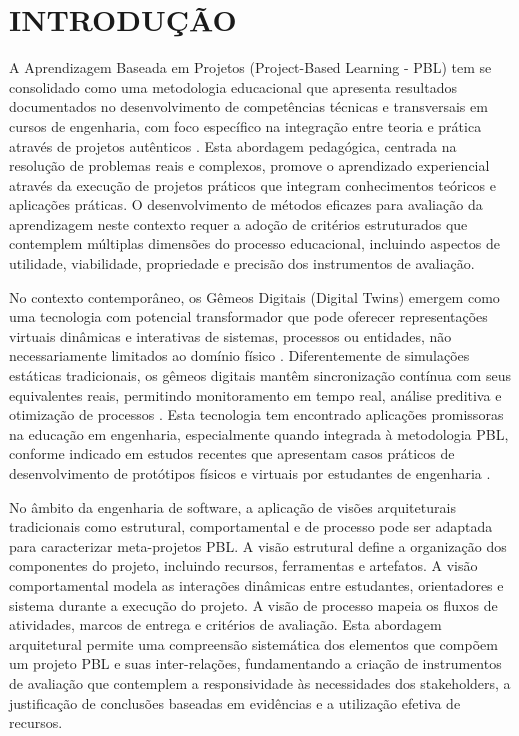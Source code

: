 \documentclass[12pt,a4paper]{article}
\renewcommand{\cite}[1]{}
\begin{document}
\bigskip

\newpage
\thispagestyle{empty}
\tableofcontents

\newpage
\pagestyle{plain}
\renewcommand{\baselinestretch}{1.5}
\normalsize

\section{INTRODUÇÃO}

A Aprendizagem Baseada em Projetos (Project-Based Learning - PBL) tem se
consolidado como uma metodologia educacional que apresenta resultados
documentados no desenvolvimento de competências técnicas e transversais em
cursos de engenharia, com foco específico na integração entre teoria e prática
através de projetos autênticos \cite{zhang2023, lavado2024, guo2020}. Esta
abordagem pedagógica, centrada na resolução de problemas reais e complexos,
promove o aprendizado experiencial através da execução de projetos práticos que
integram conhecimentos teóricos e aplicações práticas. O desenvolvimento de
métodos eficazes para avaliação da aprendizagem neste contexto requer a adoção
de critérios estruturados que contemplem múltiplas dimensões do processo
educacional, incluindo aspectos de utilidade, viabilidade, propriedade e
precisão dos instrumentos de avaliação.

No contexto contemporâneo, os Gêmeos Digitais (Digital Twins) emergem como uma
tecnologia com potencial transformador que pode oferecer representações
virtuais dinâmicas e interativas de sistemas, processos ou entidades, não
necessariamente limitados ao domínio físico \cite{grieves2014, tao2018}.
Diferentemente de simulações estáticas tradicionais, os gêmeos digitais mantêm
sincronização contínua com seus equivalentes reais, permitindo monitoramento em
tempo real, análise preditiva e otimização de processos
\cite{silveira2024panorama}. Esta tecnologia tem encontrado aplicações
promissoras na educação em engenharia, especialmente quando integrada à
metodologia PBL, conforme indicado em estudos recentes que apresentam casos
práticos de desenvolvimento de protótipos físicos e virtuais por estudantes de
engenharia \cite{bachmann2023}.


No âmbito da engenharia de software, a aplicação de visões arquiteturais
tradicionais como estrutural, comportamental e de processo pode ser adaptada
para caracterizar meta-projetos PBL. A visão estrutural define a organização
dos componentes do projeto, incluindo recursos, ferramentas e artefatos. A
visão comportamental modela as interações dinâmicas entre estudantes,
orientadores e sistema durante a execução do projeto. A visão de processo
mapeia os fluxos de atividades, marcos de entrega e critérios de avaliação.
Esta abordagem arquitetural permite uma compreensão sistemática dos elementos
que compõem um projeto PBL e suas inter-relações, fundamentando a criação de
instrumentos de avaliação que contemplem a responsividade às necessidades dos
stakeholders, a justificação de conclusões baseadas em evidências e a
utilização efetiva de recursos.
\end{document}
